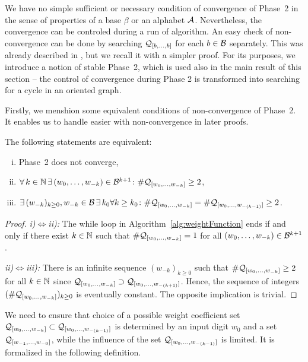 \label{sec:convergencePhase2}

We have no simple sufficient or necessary condition of convergence of Phase~2 in the sense of properties of a base $\beta$ or an alphabet $\mathcal{A}$. Nevertheless, the convergence can be controled during a run of algorithm. An easy check of non-convergence can be done by searching $\mathcal{Q}_{[b, \dots, b]}$ for each $b\in\mathcal{B}$ separately. This was already described in \cite{vu}, but we recall it with a simpler proof. For its purposes, we introduce a notion of stable Phase~2, which is used also in the main result of this section -- the control of convergence during Phase 2 is transformed into searching for a cycle in an oriented graph.

Firstly, we menshion some equivalent conditions of non-convergence of Phase~2. It enables us to handle easier with non-convergence in later  proofs.
\begin{lem}
\label{lem:equivalentStatementsForNonConvergenePhaseTwo}
The following statements are equivalent:
\begin{enumerate}[i)]
	\item Phase~2 does not converge,
	\item $\forall \,k\in \mathbb{N} \,\exists\, (w_{0}, \dots, w_{-k})\in\mathcal{B}^{k+1} \colon \#\mathcal{Q}_{[w_{0}, \dots, w_{-k}]}\geq 2$,
	\item $\exists \,(w_{-k})_{k\geq 0}, w_{-k}\in\mathcal{B} \,\exists\, k_0\forall k\geq k_0 \colon \#\mathcal{Q}_{[w_{0}, \dots, w_{-k}]}=\#\mathcal{Q}_{[w_{0}, \dots, w_{-(k-1)}]}\geq 2$.
\end{enumerate}
\end{lem}
\begin{proof}
\textit{i)}$\iff$\textit{ii):} The while loop in Algorithm~\ref{alg:weightFunction} ends if and only if there exist $k\in\mathbb{N}$ such that $\#\mathcal{Q}_{[w_{0}, \dots, w_{-k}]}=1$ for all $(w_{0}, \dots, w_{-k})\in\mathcal{B}^{k+1}$.

\textit{ii)}$\iff$\textit{iii):} There is an infinite sequence $(w_{-k})_{k\geq 0}$ such that $\#\mathcal{Q}_{[w_{0}, \dots, w_{-k}]}\geq 2$ for all $k\in\mathbb{N}$ since $\mathcal{Q}_{[w_{0}, \dots, w_{-k}]}\supset\mathcal{Q}_{[w_{0}, \dots, w_{-(k+1)}]}$. Hence, the sequence of integers $(\#\mathcal{Q}_{[w_{0}, \dots, w_{-k}]})_{k\geq 0}$ is eventually constant. The opposite implication is trivial.
\end{proof}

We need to ensure that choice of a possible weight coefficient set $\mathcal{Q}_{[w_{0}, \dots, w_{-k}]}\subset \mathcal{Q}_{[w_{0}, \dots, w_{-(k-1)}]}$ is determined by an input digit $w_0$ and a set $\mathcal{Q}_{[w_{-1}, \dots, w_{-0}]}$, while the influence of the set $\mathcal{Q}_{[w_{0}, \dots, w_{-(k-1)}]}$ is limited. It is formalized in the following definition.

